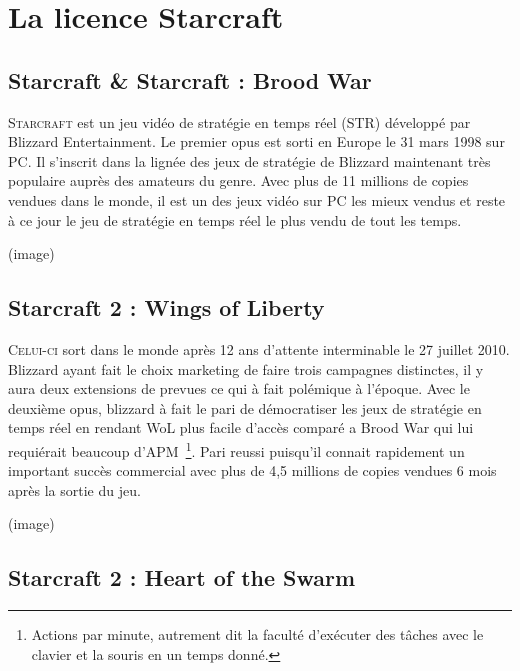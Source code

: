 \section{La licence Starcraft}%
\label{sec:la_licence_starcraft}

\subsection{Starcraft \& Starcraft : Brood War}%
\label{sub:starcraft_&_starcraft_brood_war}

\lettrine{S}{tarcraft} est un jeu vidéo de stratégie en temps réel (STR) développé
par Blizzard Entertainment. Le premier opus est sorti en Europe le 31
mars 1998 sur PC. Il s'inscrit dans la lignée des jeux de stratégie de
Blizzard maintenant très populaire auprès des amateurs du genre. Avec
plus de 11 millions de copies vendues dans le monde, il est un des
jeux vidéo sur PC les mieux vendus et reste à ce jour le jeu de
stratégie en temps réel le plus vendu de tout les temps.

(image)

\subsection{Starcraft 2 : Wings of Liberty}%
\label{sub:starcraft_2_wings_of_liberty}

\lettrine{C}{elui-ci} sort dans le monde après 12 ans d'attente
interminable le 27 juillet 2010. Blizzard ayant fait le choix marketing
de faire trois campagnes distinctes, il y aura deux extensions de
prevues ce qui à fait polémique à l'époque. Avec le deuxième opus,
blizzard à fait le pari de démocratiser les jeux de stratégie en temps
réel en rendant WoL plus facile d'accès comparé a Brood War qui lui
requiérait beaucoup d'APM\, \footnote{Actions par minute, autrement dit
la faculté d'exécuter des tâches avec le clavier et la souris en un
temps donné.}. Pari reussi puisqu'il connait
rapidement un important succès commercial avec plus de 4,5 millions de
copies vendues 6 mois après la sortie du jeu.

(image)

\subsection{Starcraft 2 : Heart of the Swarm}%
\label{sub:starcraft_2_heart_of_the_swarm}

